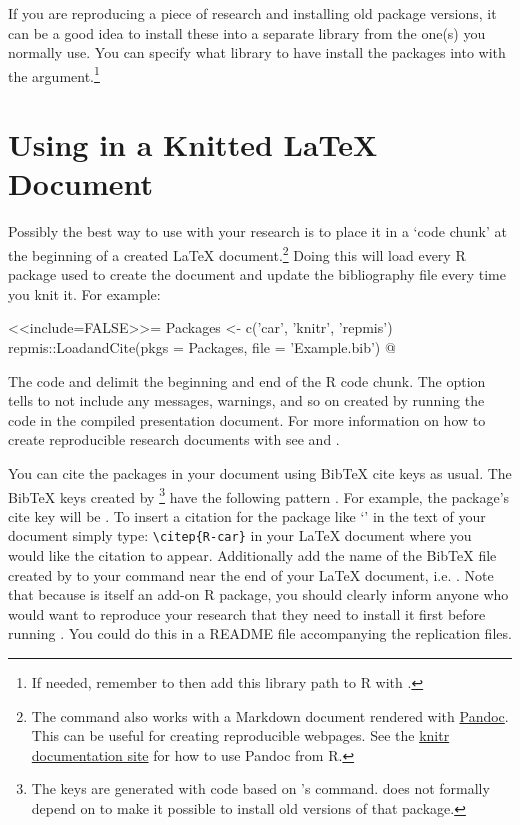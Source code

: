 If you are reproducing a piece of research and installing old package versions, it can be a good idea to install these into a separate library from the one(s) you normally use. You can specify what library to have  install the packages into with the  argument.\footnote{If needed, remember to then add this library path to R with .}

\section{Using  in a Knitted LaTeX Document}

Possibly the best way to use  with your research is to place it in a `code chunk' at the beginning of a  created LaTeX document.\footnote{The command also works with a  Markdown document rendered with \href{http://johnmacfarlane.net/pandoc/}{Pandoc}. This can be useful for creating reproducible webpages. See the \href{http://yihui.name/knitr/demo/pandoc/}{knitr documentation site} for how to use Pandoc from R.} Doing this will load every R package used to create the document and update the bibliography file every time you knit it. For example:

\begin{example}
\textless{\textless}include=FALSE\textgreater{\textgreater}=
  Packages <- c('car', 'knitr', 'repmis')
  repmis::LoadandCite(pkgs = Packages, file = 'Example.bib')
@
\end{example}

\noindent The code  and  delimit the beginning and end of the R code chunk. The  option tells  to not include any messages, warnings, and so on created by running the code in the compiled presentation document. For more information on how to create reproducible research documents with  see \cite{Xie2013} and \cite{Gandrud2013}.

You can cite the packages in your document using BibTeX cite keys as usual. The BibTeX keys created by \footnote{The keys are generated with code based on 's  command.  does not formally depend on  to make it possible to install old versions of that package.} have the following pattern . For example, the  package's cite key will be . To insert a citation for the  package like `\citep{R-car}' in the text of your document simply type: \verb|\citep{R-car}| in your LaTeX document where you would like the citation to appear. Additionally add the name of the BibTeX file created by  to your  command near the end of your LaTeX document, i.e. \verb||. Note that because  is itself an add-on R package, you should clearly inform anyone who would want to reproduce your research that they need to install it first before running . You could do this in a README file accompanying the replication files.

